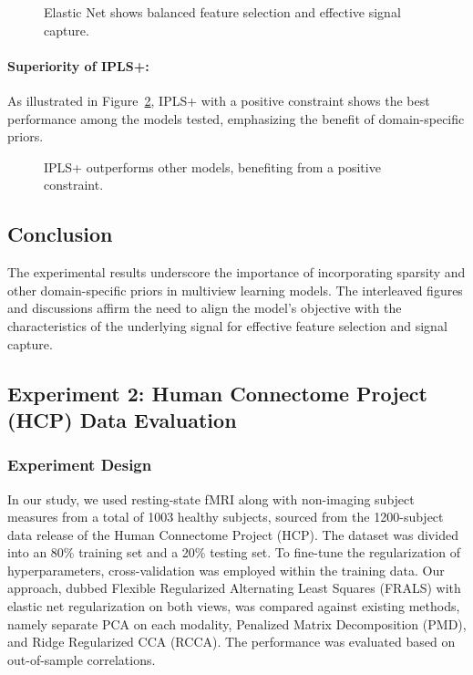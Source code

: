 \begin{figure}[h]
    \centering
    
    \caption{Elastic Net shows balanced feature selection and effective signal capture.}
    \label{fig:ElasticNet_weights}
\end{figure}

\paragraph{Superiority of IPLS+:}
As illustrated in Figure~\ref{fig:IPLS+_weights}, IPLS+ with a positive constraint shows the best performance among the models tested, emphasizing the benefit of domain-specific priors.

\begin{figure}[h]
    \centering
    
    \caption{IPLS+ outperforms other models, benefiting from a positive constraint.}
    \label{fig:IPLS+_weights}
\end{figure}

\subsection{Conclusion}

The experimental results underscore the importance of incorporating sparsity and other domain-specific priors in multiview learning models.
The interleaved figures and discussions affirm the need to align the model's objective with the characteristics of the underlying signal for effective feature selection and signal capture.




\subsection{Experiment 2: Human Connectome Project (HCP) Data Evaluation}

\subsubsection{Experiment Design}
In our study, we used resting-state fMRI along with non-imaging subject measures from a total of 1003 healthy subjects, sourced from the 1200-subject data release of the Human Connectome Project (HCP). The dataset was divided into an 80\% training set and a 20\% testing set.
To fine-tune the regularization of hyperparameters, cross-validation was employed within the training data.
Our approach, dubbed Flexible Regularized Alternating Least Squares (FRALS) with elastic net regularization on both views, was compared against existing methods, namely separate PCA on each modality, Penalized Matrix Decomposition (PMD), and Ridge Regularized CCA (RCCA). The performance was evaluated based on out-of-sample correlations.

